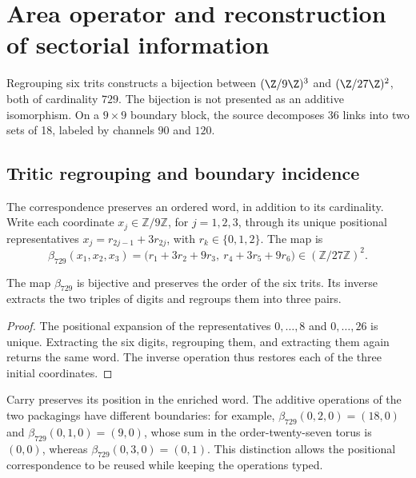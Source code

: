 \section{Area operator and reconstruction of sectorial information}
\label{ii:sec:area}
Regrouping six trits constructs a bijection between
$(\Z/9\Z)^3$ and $(\Z/27\Z)^2$, both of cardinality $729$.
The bijection is not presented as an additive isomorphism. On a
$9\times9$ boundary block, the source decomposes 36 links into two
sets of 18, labeled by channels $90$ and $120$.

\subsection{Tritic regrouping and boundary incidence}
\label{ii:sec:ii-area-incidencia-explicita}

The correspondence preserves an ordered word, in addition to its cardinality.
Write each coordinate \(x_j\in\mathbb Z/9\mathbb Z\), for
\(j=1,2,3\), through its unique positional representatives
\(x_j=r_{2j-1}+3r_{2j}\), with \(r_k\in\{0,1,2\}\). The map is
\begin{equation}
 \beta_{729}(x_1,x_2,x_3)
 =\bigl(r_1+3r_2+9r_3,\ r_4+3r_5+9r_6\bigr)
 \in(\mathbb Z/27\mathbb Z)^2.
 \label{ii:eq:ii-area-beta729}
\end{equation}

\begin{proposition}
\label{ii:prop:ii-area-beta729}
The map \(\beta_{729}\) is bijective and preserves the order of the
six trits. Its inverse extracts the two triples of digits and regroups them
into three pairs.
\end{proposition}
\begin{proof}
The positional expansion of the representatives \(0,\ldots,8\) and
\(0,\ldots,26\) is unique. Extracting the six digits, regrouping them, and
extracting them again returns the same word. The inverse operation
thus restores each of the three initial coordinates.
\end{proof}

Carry preserves its position in the enriched word. The additive
operations of the two packagings have different boundaries: for example,
\(\beta_{729}(0,2,0)=(18,0)\) and
\(\beta_{729}(0,1,0)=(9,0)\), whose sum in the order-twenty-seven
torus is \((0,0)\), whereas
\(\beta_{729}(0,3,0)=(0,1)\). This distinction allows the positional
correspondence to be reused while keeping the operations typed.

